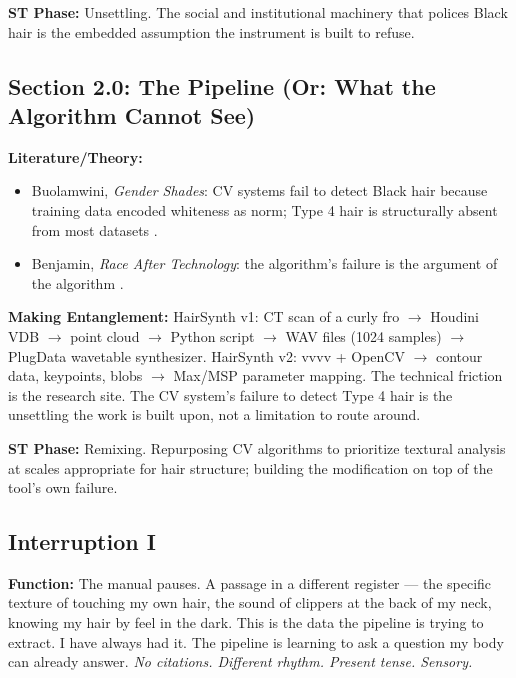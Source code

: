 \noindent\textbf{ST Phase:} Unsettling. The social and institutional machinery that polices Black hair is the embedded assumption the instrument is built to refuse.

\medskip

\subsection*{Section 2.0: The Pipeline (Or: What the Algorithm Cannot See)}

\noindent\textbf{Literature/Theory:}
\begin{itemize}[noitemsep]
    \item Buolamwini, \textit{Gender Shades}: CV systems fail to detect Black hair because training data encoded whiteness as norm; Type 4 hair is structurally absent from most datasets \parencite{Buolamwini_2018}.
    \item Benjamin, \textit{Race After Technology}: the algorithm's failure is the argument of the algorithm \parencite{Benjamin_2019a}.
\end{itemize}

\noindent\textbf{Making Entanglement:} HairSynth v1: CT scan of a curly fro $\to$ Houdini VDB $\to$ point cloud $\to$ Python script $\to$ WAV files (1024 samples) $\to$ PlugData wavetable synthesizer. HairSynth v2: vvvv + OpenCV $\to$ contour data, keypoints, blobs $\to$ Max/MSP parameter mapping. The technical friction is the research site. The CV system's failure to detect Type 4 hair is the unsettling the work is built upon, not a limitation to route around.

\noindent\textbf{ST Phase:} Remixing. Repurposing CV algorithms to prioritize textural analysis at scales appropriate for hair structure; building the modification on top of the tool's own failure.

\medskip

\subsection*{Interruption I}

\noindent\textbf{Function:} The manual pauses. A passage in a different register — the specific texture of touching my own hair, the sound of clippers at the back of my neck, knowing my hair by feel in the dark. This is the data the pipeline is trying to extract. I have always had it. The pipeline is learning to ask a question my body can already answer. \textit{No citations. Different rhythm. Present tense. Sensory.}

